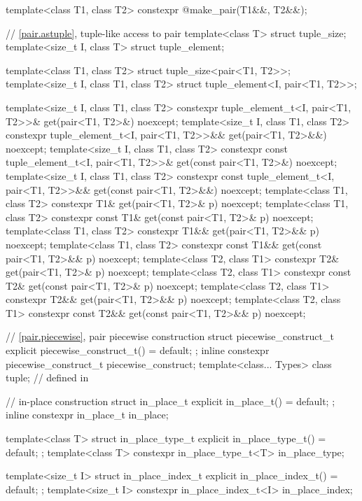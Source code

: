 \begin{codeblock}
{  template<class T1, class T2>
    constexpr @\seebelow@ make_pair(T1&&, T2&&);

  // \ref{pair.astuple}, tuple-like access to pair
  template<class T> struct tuple_size;
  template<size_t I, class T> struct tuple_element;

  template<class T1, class T2> struct tuple_size<pair<T1, T2>>;
  template<size_t I, class T1, class T2> struct tuple_element<I, pair<T1, T2>>;

  template<size_t I, class T1, class T2>
    constexpr tuple_element_t<I, pair<T1, T2>>& get(pair<T1, T2>&) noexcept;
  template<size_t I, class T1, class T2>
    constexpr tuple_element_t<I, pair<T1, T2>>&& get(pair<T1, T2>&&) noexcept;
  template<size_t I, class T1, class T2>
    constexpr const tuple_element_t<I, pair<T1, T2>>& get(const pair<T1, T2>&) noexcept;
  template<size_t I, class T1, class T2>
    constexpr const tuple_element_t<I, pair<T1, T2>>&& get(const pair<T1, T2>&&) noexcept;
  template<class T1, class T2>
    constexpr T1& get(pair<T1, T2>& p) noexcept;
  template<class T1, class T2>
    constexpr const T1& get(const pair<T1, T2>& p) noexcept;
  template<class T1, class T2>
    constexpr T1&& get(pair<T1, T2>&& p) noexcept;
  template<class T1, class T2>
    constexpr const T1&& get(const pair<T1, T2>&& p) noexcept;
  template<class T2, class T1>
    constexpr T2& get(pair<T1, T2>& p) noexcept;
  template<class T2, class T1>
    constexpr const T2& get(const pair<T1, T2>& p) noexcept;
  template<class T2, class T1>
    constexpr T2&& get(pair<T1, T2>&& p) noexcept;
  template<class T2, class T1>
    constexpr const T2&& get(const pair<T1, T2>&& p) noexcept;

  // \ref{pair.piecewise}, pair piecewise construction
  struct piecewise_construct_t {
    explicit piecewise_construct_t() = default;
  };
  inline constexpr piecewise_construct_t piecewise_construct{};
  template<class... Types> class tuple;         // defined in 

  // in-place construction%
%
%
%
%
%
  struct in_place_t {
    explicit in_place_t() = default;
  };
  inline constexpr in_place_t in_place{};

  template<class T>
    struct in_place_type_t {
      explicit in_place_type_t() = default;
    };
  template<class T> constexpr in_place_type_t<T> in_place_type{};

  template<size_t I>
    struct in_place_index_t {
      explicit in_place_index_t() = default;
    };
  template<size_t I> constexpr in_place_index_t<I> in_place_index{};
}
\end{codeblock}

